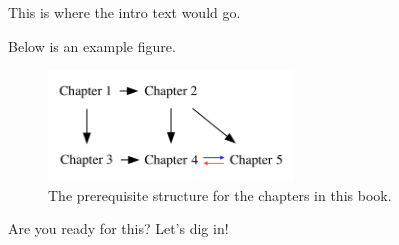 

\label{sec:introduction}

	This is where the intro text would go.
	
	
	Below is an example figure.

	\begin{figure}[htb]
		\centering
		\includegraphics[width=0.58\textwidth]{figures/dot/chap_prereqs.png}
		\vspace{-3mm}
		\caption{The prerequisite structure for the chapters in this book.}
		\label{fig:chap_prereqs}
	\end{figure}


	Are you ready for this? Let's dig in!


